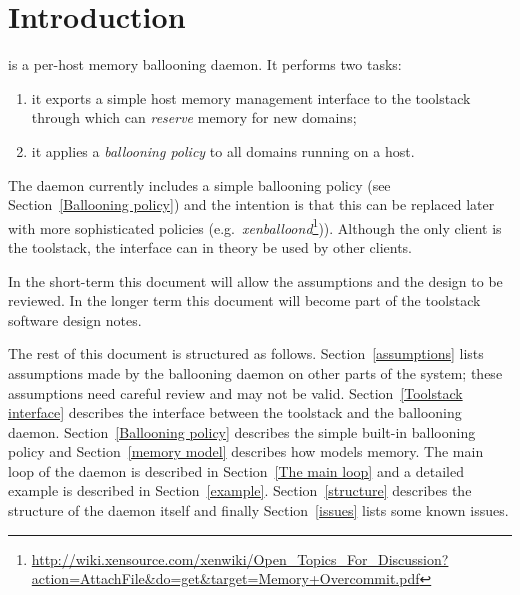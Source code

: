 \documentclass{article}
\begin{document}



\section{Introduction}

\squeezed{} is a per-host memory ballooning daemon. It performs two tasks:
\begin{enumerate}
\item it exports a simple host memory management interface to the \xapi{} toolstack through which \xapi{} can {\em reserve} memory for new domains;
\item it applies a {\em ballooning policy} to all domains running on a host.
\end{enumerate}
The daemon currently includes a simple ballooning policy (see Section~\ref{Ballooning policy}) and the intention is that this can be replaced later with more sophisticated policies (e.g.\ {\em xenballoond}\footnote{\url{http://wiki.xensource.com/xenwiki/Open_Topics_For_Discussion?action=AttachFile&do=get&target=Memory+Overcommit.pdf}})). Although the only client is the \xapi{} toolstack, the interface can in theory be used by other clients.

In the short-term this document will allow the assumptions and the design to be reviewed. In the longer term this document will become part of the \xapi{} toolstack software design notes.

The rest of this document is structured as follows. Section~\ref{assumptions} lists assumptions made by the ballooning daemon on other parts of the system; these assumptions need careful review and may not be valid. Section~\ref{Toolstack interface} describes the interface between the toolstack and the ballooning daemon. Section~\ref{Ballooning policy} describes the simple built-in ballooning policy and Section~\ref{memory model} describes how \squeezed{} models memory. The main loop of the daemon is described in Section~\ref{The main loop} and a detailed example is described in Section~\ref{example}. Section~\ref{structure} describes the structure of the daemon itself and finally Section~\ref{issues} lists some known issues.
\end{document}
